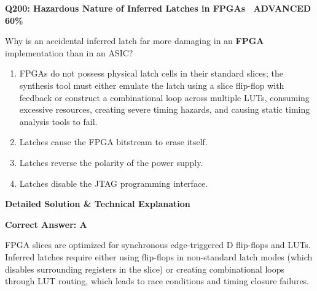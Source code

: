 \documentclass[11pt,a4paper]{article}
\newcommand{\badgeadv}{{\color{white}\colorbox{advred}{\bfseries\sffamily\tiny\ ADVANCED 60\%\ }}}
\newenvironment{qbox}[2]{%
  \begin{mdframed}[style=qstyle]%
  {\bfseries\sffamily\color{primaryblue}#1 \hfill #2}\par\vspace{2pt}%
}{%
  \end{mdframed}%
}
\newenvironment{ansbox}{%
  \begin{mdframed}[style=ansstyle]%
  {\bfseries\sffamily\color{ansgreen}\small Detailed Solution \& Technical Explanation}\par\vspace{2pt}\small%
}{%
  \end{mdframed}%
}
\begin{document}
\begin{qbox}{Q200: Hazardous Nature of Inferred Latches in FPGAs}{\badgeadv}
Why is an accidental inferred latch far more damaging in an \textbf{FPGA} implementation than in an ASIC?
\begin{enumerate}[label=\textbf{\Alph*.}]
  \item FPGAs do not possess physical latch cells in their standard slices; the synthesis tool must either emulate the latch using a slice flip-flop with feedback or construct a combinational loop across multiple LUTs, consuming excessive resources, creating severe timing hazards, and causing static timing analysis tools to fail.
  \item Latches cause the FPGA bitstream to erase itself.
  \item Latches reverse the polarity of the power supply.
  \item Latches disable the JTAG programming interface.
\end{enumerate}
\end{qbox}
\begin{ansbox}
\textbf{Correct Answer: A}

FPGA slices are optimized for synchronous edge-triggered D flip-flops and LUTs. Inferred latches require either using flip-flops in non-standard latch modes (which disables surrounding registers in the slice) or creating combinational loops through LUT routing, which leads to race conditions and timing closure failures.
\end{ansbox}
\end{document}
